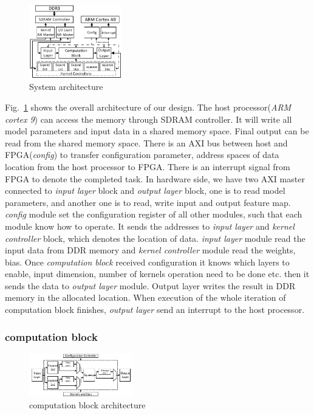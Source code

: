 \documentclass[conference]{IEEEtran}
\begin{document}
\begin{figure}[htbp]
\centerline{\includegraphics[width=0.36\textwidth]{archiecture.pdf}}
\caption{System architecture}
\label{arch}
\end{figure}

Fig.~\ref{arch} shows the overall architecture of our design. The host processor(\textit{ARM cortex 9}) can access the memory through SDRAM controller. It will write all model parameters and input data in a shared memory space. Final output can be read from the shared memory space. There is an AXI bus between host and FPGA(\textit{config}) to transfer configuration parameter, address spaces of data location from the host processor to FPGA. There is an interrupt signal from FPGA to denote the completed task. In hardware side, we have two AXI master connected to \textit{input layer} block and \textit{output layer} block, one is to read model parameters, and another one is to read, write input and output feature map. \textit{config} module set the configuration register of all other modules, such that each module know how to operate. It sends the addresses to \textit{input layer} and \textit{kernel controller} block, which denotes the location of data. \textit{input layer} module read the input data from DDR memory and \textit{kernel controller} module read the weights, bias. Once \textit{computation block} received configuration it knows which layers to enable, input dimension, number of kernels operation need to be done etc. then it sends the data to \textit{output layer} module. Output layer writes the result in DDR memory in the allocated location. When execution of the whole iteration of computation block finishes, \textit{output layer} send an interrupt to the host processor.


\subsubsection{computation block}

\begin{figure}[htbp]
\centerline{\includegraphics[width=0.4\textwidth]{computation.pdf}}
\caption{computation block architecture}
\label{cmp}
\end{figure}
\end{document}
